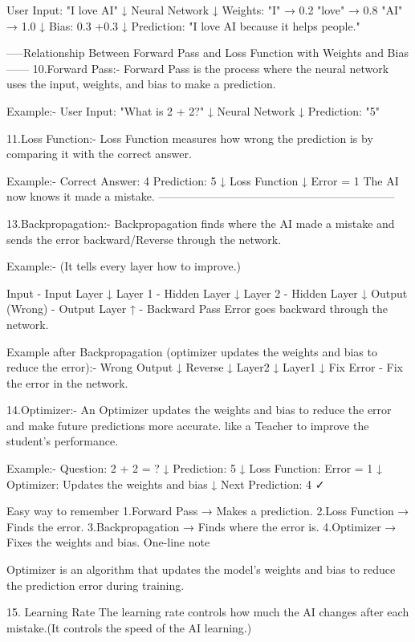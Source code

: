 User Input:
"I love AI"
        ↓
Neural Network
        ↓
Weights:
"I"    → 0.2
"love" → 0.8
"AI"   → 1.0
        ↓
Bias: 0.3 
+0.3
        ↓
Prediction: "I love AI because it helps people."


-----Relationship Between Forward Pass and Loss Function with Weights and Bias------
10.Forward Pass:-
Forward Pass is the process where the neural network uses the input, weights, and bias to make a prediction.

Example:-
User Input:
"What is 2 + 2?"
        ↓
Neural Network
        ↓
Prediction: "5"




11.Loss Function:-
Loss Function measures how wrong the prediction is by comparing it with the correct answer.

Example:-
Correct Answer:
4
Prediction:
5
        ↓
Loss Function
        ↓
Error = 1
The AI now knows it made a mistake.
---------------------------------------------------------------

13.Backpropagation:-
Backpropagation finds where the AI made a mistake and sends the error backward/Reverse through the network.

Example:- (It tells every layer how to improve.)

Input - Input Layer
↓
Layer 1 - Hidden Layer
↓
Layer 2 - Hidden Layer
↓
Output (Wrong) - Output Layer
↑ - Backward Pass
Error goes backward through the network.

Example after Backpropagation (optimizer updates the weights and bias to reduce the error):-
Wrong Output
↓
Reverse
↓
Layer2
↓
Layer1
↓
Fix Error - Fix the error in the network.

14.Optimizer:-
An Optimizer updates the weights and bias to reduce the error and make future predictions more accurate.
like a Teacher to improve the student's performance.

Example:-
Question:
2 + 2 = ?
        ↓
Prediction:
5
        ↓
Loss Function:
Error = 1
        ↓
Optimizer:
Updates the weights and bias
        ↓
Next Prediction:
4 ✓


Easy way to remember
1.Forward Pass → Makes a prediction.
2.Loss Function → Finds the error.
3.Backpropagation → Finds where the error is.
4.Optimizer → Fixes the weights and bias.
One-line note

Optimizer is an algorithm that updates the model's weights and bias to reduce the prediction error during training.



15. Learning Rate
The learning rate controls how much the AI changes after each mistake.(It controls the speed of the AI learning.)

